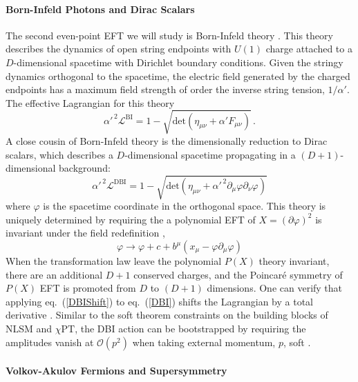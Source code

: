 \documentclass[12pt,letter]{article}
\def\eqn#1{eq.~(\ref{#1})}
\def\be{\begin{equation}}
\def\ee{\end{equation}}
\begin{document}
\paragraph{Born-Infeld Photons and Dirac Scalars}
The second even-point EFT we will study is Born-Infeld theory \cite{Born:1934gh}. This theory describes the dynamics of open string endpoints with $U(1)$ charge attached to a $D$-dimensional spacetime with Dirichlet boundary conditions. Given the stringy dynamics orthogonal to the spacetime, the electric field generated by the charged endpoints has a maximum field strength of order the inverse string tension, $1/\alpha'$. The effective Lagrangian for this theory
\begin{equation}
 \label{biLag}
  \alpha'^{\,2}\mathcal{L}^{\text{BI}} = 1-\sqrt{\text{det}(\eta_{\mu\nu}+\alpha' F_{\mu\nu})} \,.
\end{equation}
A close cousin of Born-Infeld theory is the dimensionally reduction to Dirac scalars, which describes a $D$-dimensional spacetime propagating in a $(D+1)$-dimensional background:
\begin{equation}
 \label{DBI}
  \alpha'^{\,2}\mathcal{L}^{\text{DBI}} =1- \sqrt{\text{det}(\eta_{\mu\nu}+\alpha'^{\,2} \partial_\mu \varphi \partial_\nu \varphi)}
\end{equation}
where $\varphi$ is the spacetime coordinate in the orthogonal space. This theory is uniquely determined by requiring the a polynomial EFT of $X=(\partial \varphi)^2$ is invariant under the field redefinition \cite{Cheung:2016drk},
\be\label{DBIShift}
\varphi \rightarrow \varphi + c + b^{\mu} (x_\mu - \varphi \partial_\mu \varphi)
\ee
When the transformation law leave the polynomial $P(X)$ theory invariant, there are an additional $D+1$ conserved charges, and the Poincar\'{e} symmetry of $P(X)$ EFT is promoted from $D$ to $(D+1)$ dimensions. One can verify that applying \eqn{DBIShift} to \eqn{DBI} shifts the Lagrangian by a total derivative \cite{deRham:2010eu}. Similar to the soft theorem constraints on the building blocks of NLSM and $\chi \text{PT}$, the DBI action can be bootstrapped by requiring the amplitudes vanish at $\mathcal{O}(p^2)$ when taking external momentum, $p$, soft \cite{Cheung:2016drk}. 
\paragraph{Volkov-Akulov Fermions and Supersymmetry}
\end{document}
